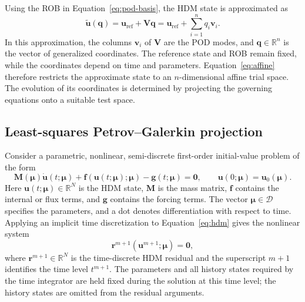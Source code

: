 \documentclass[a4paper,12pt]{article}
\newcommand{\vect}[1]{\boldsymbol{#1}}
\newcommand{\matr}[1]{\boldsymbol{#1}}
\begin{document}
Using the ROB in Equation~\eqref{eq:pod-basis}, the HDM state is approximated as
\begin{equation}
 \widetilde{\vect{u}}(\vect{q})
 =\vect{u}_{\mathrm{ref}}+\matr{V}\vect{q}
 =\vect{u}_{\mathrm{ref}}+\sum_{i=1}^nq_i\vect{v}_i.
 \label{eq:affine}
\end{equation}
In this approximation, the columns $\vect{v}_i$ of $\matr{V}$ are the POD modes, and $\vect{q}\in\mathbb R^n$ is the vector of generalized coordinates. The reference state and ROB remain fixed, while the coordinates depend on time and parameters. Equation~\eqref{eq:affine} therefore restricts the approximate state to an $n$-dimensional affine trial space. The evolution of its coordinates is determined by projecting the governing equations onto a suitable test space.

\subsection{Least-squares Petrov--Galerkin projection}
\label{sec:lspg}

Consider a parametric, nonlinear, semi-discrete first-order initial-value problem of the form
\begin{equation}
 \matr{M}(\vect{\mu})\dot{\vect{u}}(t;\vect{\mu})
 +\vect{f}(\vect{u}(t;\vect{\mu});\vect{\mu})
 -\vect{g}(t;\vect{\mu})=\vect{0},
 \qquad \vect{u}(0;\vect{\mu})=\vect{u}_0(\vect{\mu}).
 \label{eq:hdm}
\end{equation}
Here $\vect{u}(t;\vect{\mu})\in\mathbb R^N$ is the HDM state, $\matr{M}$ is the mass matrix, $\vect{f}$ contains the internal or flux terms, and $\vect{g}$ contains the forcing terms. The vector $\vect{\mu}\in\mathcal D$ specifies the parameters, and a dot denotes differentiation with respect to time. Applying an implicit time discretization to Equation~\eqref{eq:hdm} gives the nonlinear system
\begin{equation}
 \vect{r}^{m+1}(\vect{u}^{m+1};\vect{\mu})=\vect{0},
 \label{eq:discrete-hdm}
\end{equation}
where $\vect{r}^{m+1}\in\mathbb R^N$ is the time-discrete HDM residual and the superscript $m+1$ identifies the time level $t^{m+1}$. The parameters and all history states required by the time integrator are held fixed during the solution at this time level; the history states are omitted from the residual arguments.
\end{document}
